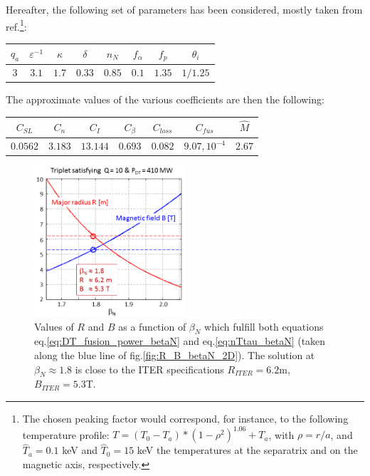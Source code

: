 Hereafter, the following set of parameters has been considered, mostly taken from ref.\cite{Johner2011}\footnote{The chosen peaking factor would correspond, for instance, to the following temperature profile: $T = (T_0-T_a)*(1-\rho^2)^{1.06} + T_a$, with $\rho=r/a$, and $\hat T_a=0.1$ keV and  $\hat T_0=15$ keV the temperatures at the separatrix and on the magnetic axis, respectively.}:
\begin{center}
	\begin{tabular}{c|c|c|c|c|c|c|c}
		\hline
		$q_a$ & $\varepsilon^{-1}$ & $\kappa$ & $\delta$ & $n_N$ & $f_\alpha$ & $f_p$ & $\theta_i$ \\
		\hline
		$3$   & $3.1$ & $1.7$ & $0.33$ & $0.85$ & $0.1$ & $1.35$ & $1/1.25$ \\
		\hline	
	\end{tabular}
\end{center}
The approximate values of the various coefficients are then the following:
\begin{center}
	\begin{tabular}{c|c|c|c|c|c|c}
		\hline
		$C_{SL}$ & $C_n$ & $C_I$ & $C_\beta$ & $C_{loss}$ & $C_{fus}$ & $\hat M$ \\
		\hline
		$0.0562$ & $3.183$ & $13.144$ & $0.693$ & $0.082$ & $9.07,10^{-4}$ & $2.67$ \\
		\hline	
	\end{tabular}
\end{center}
\bigskip

\begin{figure} 
	\begin{center}
		\includegraphics[width=0.5\textwidth]{figures/Fig_R_B_betaN_solutions_v2.png}
		\caption{Values of $R$ and $B$ as a function of $\beta_N$ which fulfill both equations eq.\ref{eq:DT_fusion_power_betaN} and eq.\ref{eq:nTtau_betaN} (taken along the blue line of fig.\ref{fig:R_B_betaN_2D}). The solution at $\beta_N \approx 1.8$ is close to the ITER specifications $R_{ITER}=6.2$m, $B_{ITER}=5.3$T.}
		\label{fig:solutions_betaN}
	\end{center}
\end{figure}

